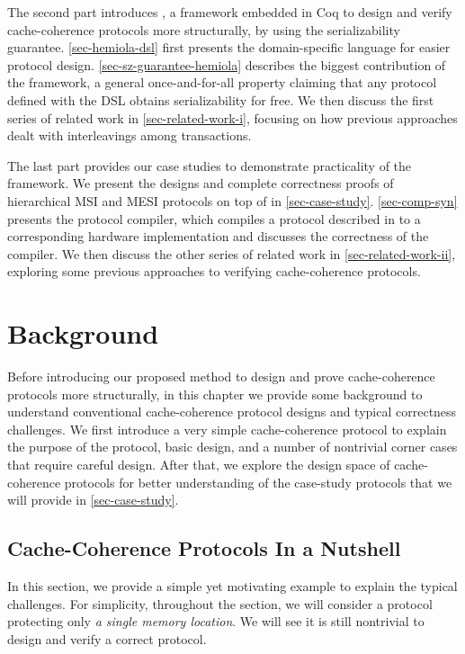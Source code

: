 The second part introduces \hemiola{}, a framework embedded in Coq to design and verify cache-coherence protocols more structurally, by using the serializability guarantee.
\autoref{sec-hemiola-dsl} first presents the \hemiola{} domain-specific language for easier protocol design.
\autoref{sec-sz-guarantee-hemiola} describes the biggest contribution of the framework, a general once-and-for-all property claiming that any protocol defined with the DSL obtains serializability for free.
We then discuss the first series of related work in \autoref{sec-related-work-i}, focusing on how previous approaches dealt with interleavings among transactions.

The last part provides our case studies to demonstrate practicality of the framework.
We present the designs and complete correctness proofs of hierarchical MSI and MESI protocols on top of \hemiola{} in \autoref{sec-case-study}.
\autoref{sec-comp-syn} presents the protocol compiler, which compiles a protocol described in \hemiola{} to a corresponding hardware implementation and discusses the correctness of the compiler.
We then discuss the other series of related work in \autoref{sec-related-work-ii}, exploring some previous approaches to verifying cache-coherence protocols.

\chapter{Background}
\label{sec-background}

Before introducing our proposed method to design and prove cache-coherence protocols more structurally, in this chapter we provide some background to understand conventional cache-coherence protocol designs and typical correctness challenges.
We first introduce a very simple cache-coherence protocol to explain the purpose of the protocol, basic design, and a number of nontrivial corner cases that require careful design.
After that, we explore the design space of cache-coherence protocols for better understanding of the case-study protocols that we will provide in \autoref{sec-case-study}.

\section{Cache-Coherence Protocols In a Nutshell}
\label{sec-nutshell}

In this section, we provide a simple yet motivating example to explain the typical challenges.
For simplicity, throughout the section, we will consider a protocol protecting only \emph{a single memory location}.
We will see it is still nontrivial to design and verify a correct protocol.

